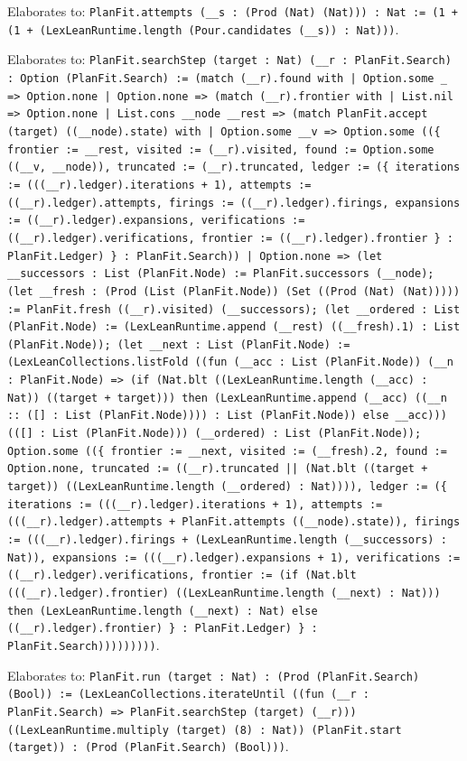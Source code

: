 \documentclass[11pt]{article}
\begin{document}
\noindent Elaborates to: \texttt{PlanFit.attempts (\_\_s : (Prod (Nat) (Nat))) : Nat := (1 + (1 + (LexLeanRuntime.length (Pour.candidates (\_\_s)) : Nat)))}.\par
\noindent Elaborates to: \texttt{PlanFit.searchStep (target : Nat) (\_\_r : PlanFit.Search) : Option (PlanFit.Search) := (match (\_\_r).found with | Option.some \_ => Option.none | Option.none => (match (\_\_r).frontier with | List.nil => Option.none | List.cons \_\_node \_\_rest => (match PlanFit.accept (target) ((\_\_node).state) with | Option.some \_\_v => Option.some ((\{ frontier := \_\_rest, visited := (\_\_r).visited, found := Option.some ((\_\_v, \_\_node)), truncated := (\_\_r).truncated, ledger := (\{ iterations := (((\_\_r).ledger).iterations + 1), attempts := ((\_\_r).ledger).attempts, firings := ((\_\_r).ledger).firings, expansions := ((\_\_r).ledger).expansions, verifications := ((\_\_r).ledger).verifications, frontier := ((\_\_r).ledger).frontier \} : PlanFit.Ledger) \} : PlanFit.Search)) | Option.none => (let \_\_successors : List (PlanFit.Node) := PlanFit.successors (\_\_node); (let \_\_fresh : (Prod (List (PlanFit.Node)) (Set ((Prod (Nat) (Nat))))) := PlanFit.fresh ((\_\_r).visited) (\_\_successors); (let \_\_ordered : List (PlanFit.Node) := (LexLeanRuntime.append (\_\_rest) ((\_\_fresh).1) : List (PlanFit.Node)); (let \_\_next : List (PlanFit.Node) := (LexLeanCollections.listFold ((fun (\_\_acc : List (PlanFit.Node)) (\_\_n : PlanFit.Node) => (if (Nat.blt ((LexLeanRuntime.length (\_\_acc) : Nat)) ((target + target))) then (LexLeanRuntime.append (\_\_acc) ((\_\_n :: ([] : List (PlanFit.Node)))) : List (PlanFit.Node)) else \_\_acc))) (([] : List (PlanFit.Node))) (\_\_ordered) : List (PlanFit.Node)); Option.some ((\{ frontier := \_\_next, visited := (\_\_fresh).2, found := Option.none, truncated := ((\_\_r).truncated || (Nat.blt ((target + target)) ((LexLeanRuntime.length (\_\_ordered) : Nat)))), ledger := (\{ iterations := (((\_\_r).ledger).iterations + 1), attempts := (((\_\_r).ledger).attempts + PlanFit.attempts ((\_\_node).state)), firings := (((\_\_r).ledger).firings + (LexLeanRuntime.length (\_\_successors) : Nat)), expansions := (((\_\_r).ledger).expansions + 1), verifications := ((\_\_r).ledger).verifications, frontier := (if (Nat.blt (((\_\_r).ledger).frontier) ((LexLeanRuntime.length (\_\_next) : Nat))) then (LexLeanRuntime.length (\_\_next) : Nat) else ((\_\_r).ledger).frontier) \} : PlanFit.Ledger) \} : PlanFit.Search)))))))))}.\par
\noindent Elaborates to: \texttt{PlanFit.run (target : Nat) : (Prod (PlanFit.Search) (Bool)) := (LexLeanCollections.iterateUntil ((fun (\_\_r : PlanFit.Search) => PlanFit.searchStep (target) (\_\_r))) ((LexLeanRuntime.multiply (target) (8) : Nat)) (PlanFit.start (target)) : (Prod (PlanFit.Search) (Bool)))}.\par
\end{document}
